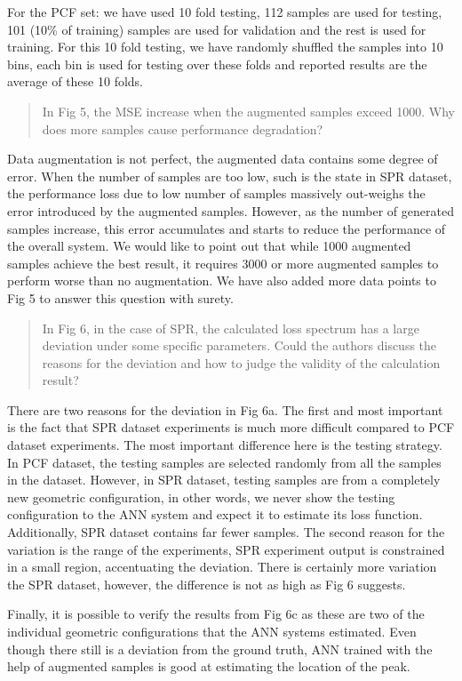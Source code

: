 \documentclass{article}
\begin{document}
	For the PCF set: we have used 10 fold testing, 112 samples are used for testing, 101 (10\% of training) samples are used for validation and the rest is used for training. For this 10 fold testing, we have randomly shuffled the samples into 10 bins, each bin is used for testing over these folds and reported results are the average of these 10 folds.
	
	\begin{quote}
	In Fig 5, the MSE increase when the augmented samples exceed 1000. Why does more samples cause performance degradation?
	\end{quote}
	
	Data augmentation is not perfect, the augmented data contains some degree of error. When the number of samples are too low, such is the state in SPR dataset, the performance loss due to low number of samples massively out-weighs the error introduced by the augmented samples. However, as the number of generated samples increase, this error accumulates and starts to reduce the performance of the overall system. We would like to point out that while 1000 augmented samples achieve the best result, it requires 3000 or more augmented samples to perform worse than no augmentation. We have also added more data points to Fig 5 to answer this question with surety.
	
	
	\begin{quote}
	In Fig 6, in the case of SPR, the calculated loss spectrum has a large deviation under some specific parameters. Could the authors discuss the reasons for the deviation and how to judge the validity of the calculation result?
	\end{quote}
	
	There are two reasons for the deviation in Fig 6a. The first and most important is the fact that SPR dataset experiments is much more difficult compared to PCF dataset experiments. The most important difference here is the testing strategy. In PCF dataset, the testing samples are selected randomly from all the samples in the dataset. However, in SPR dataset, testing samples are from a completely new geometric configuration, in other words, we never show the testing configuration to the ANN system and expect it to estimate its loss function. Additionally, SPR dataset contains far fewer samples. The second reason for the variation is the range of the experiments, SPR experiment output is constrained in a small region, accentuating the deviation. There is certainly more variation the SPR dataset, however, the difference is not as high as Fig 6 suggests.
	
	Finally, it is possible to verify the results from Fig 6c as these are two of the individual geometric configurations that the ANN systems estimated. Even though there still is a deviation from the ground truth, ANN trained with the help of augmented samples is good at estimating the location of the peak.
	
\end{document}
